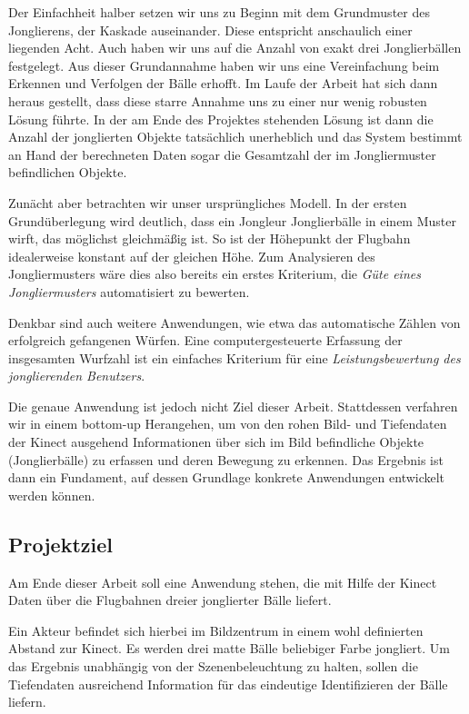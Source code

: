 \documentclass[12pt,a4paper,ngerman]{scrartcl}
\begin{document}
Der Einfachheit halber setzen wir uns zu Beginn mit dem Grundmuster des Jonglierens,
der Kaskade\cite{libraryjuggling} auseinander. Diese entspricht anschaulich einer liegenden Acht. Auch
haben wir uns auf die Anzahl von exakt drei Jonglierbällen festgelegt. Aus dieser
Grundannahme haben wir uns eine Vereinfachung beim Erkennen und Verfolgen der Bälle
erhofft. Im Laufe der Arbeit hat sich dann heraus gestellt, dass diese starre Annahme
uns zu einer nur wenig robusten Lösung führte. In der am Ende des Projektes
stehenden Lösung ist dann die Anzahl der jonglierten Objekte tatsächlich unerheblich
und das System bestimmt an Hand der berechneten Daten sogar die Gesamtzahl der
im Jongliermuster befindlichen Objekte.

Zunächt aber betrachten wir unser ursprüngliches Modell. In der ersten
Grundüberlegung wird deutlich, dass ein Jongleur Jonglierbälle
in einem Muster wirft, das möglichst gleichmäßig ist.
So ist der Höhepunkt der Flugbahn idealerweise konstant auf der gleichen Höhe.
Zum Analysieren des Jongliermusters wäre dies also bereits ein erstes Kriterium,
die \textit{Güte eines Jongliermusters} automatisiert zu bewerten.

Denkbar sind auch weitere Anwendungen, wie etwa das automatische Zählen von
erfolgreich gefangenen Würfen. Eine computergesteuerte Erfassung der insgesamten
Wurfzahl ist ein einfaches Kriterium für eine \textit{Leistungsbewertung des
jonglierenden Benutzers}.

Die genaue Anwendung ist jedoch nicht Ziel dieser Arbeit. Stattdessen verfahren wir
in einem bottom-up Herangehen, um von den rohen Bild- und Tiefendaten der Kinect
ausgehend Informationen über sich im Bild befindliche Objekte (Jonglierbälle) zu
erfassen und deren Bewegung zu erkennen. Das Ergebnis ist dann ein Fundament, auf
dessen Grundlage konkrete Anwendungen entwickelt werden können.

\subsection{Projektziel}

Am Ende dieser Arbeit soll eine Anwendung stehen, die mit Hilfe der Kinect Daten
über die Flugbahnen dreier jonglierter Bälle liefert.

Ein Akteur befindet sich hierbei im Bildzentrum in einem wohl definierten Abstand
zur Kinect. Es werden drei matte Bälle beliebiger Farbe jongliert. Um das Ergebnis
unabhängig von der Szenenbeleuchtung zu halten, sollen die Tiefendaten ausreichend
Information für das eindeutige Identifizieren der Bälle liefern.
\end{document}
